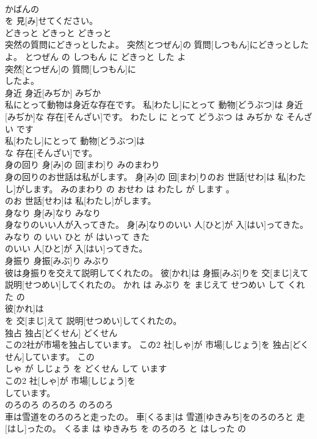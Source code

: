 \documentclass[8pt]{extreport}
\begin{document}
\begin{CJK}{UTF8}{min}
\\	かばんの
\\	を 見[み]せてください。			
\\	どきっと	どきっと	どきっと	
\\	突然の質問にどきっとしたよ。	突然[とつぜん]の 質問[しつもん]にどきっとしたよ。	とつぜん の しつもん に どきっと した よ	
\\	突然[とつぜん]の 質問[しつもん]に
\\	したよ。			
\\	身近	身近[みぢか]	みぢか	
\\	私にとって動物は身近な存在です。	私[わたし]にとって 動物[どうぶつ]は 身近[みぢか]な 存在[そんざい]です。	わたし に とって どうぶつ は みぢか な そんざい です	
\\	私[わたし]にとって 動物[どうぶつ]は
\\	な 存在[そんざい]です。			
\\	身の回り	身[み]の 回[まわ]り	みのまわり	
\\	身の回りのお世話は私がします。	身[み]の 回[まわ]りのお 世話[せわ]は 私[わたし]がします。	みのまわり の おせわ は わたし が します 。	
\\	のお 世話[せわ]は 私[わたし]がします。			
\\	身なり	身[み]なり	みなり	
\\	身なりのいい人が入ってきた。	身[み]なりのいい 人[ひと]が 入[はい]ってきた。	みなり の いい ひと が はいって きた	
\\	のいい 人[ひと]が 入[はい]ってきた。			
\\	身振り	身振[みぶ]り	みぶり	
\\	彼は身振りを交えて説明してくれたの。	彼[かれ]は 身振[みぶ]りを 交[まじ]えて 説明[せつめい]してくれたの。	かれ は みぶり を まじえて せつめい して くれた の	
\\	彼[かれ]は
\\	を 交[まじ]えて 説明[せつめい]してくれたの。			
\\	独占	独占[どくせん]	どくせん	
\\	この2社が市場を独占しています。	この2 社[しゃ]が 市場[しじょう]を 独占[どくせん]しています。	この 
\\	しゃ が しじょう を どくせん して います	
\\	この2 社[しゃ]が 市場[しじょう]を
\\	しています。			
\\	のろのろ	のろのろ	のろのろ	
\\	車は雪道をのろのろと走ったの。	車[くるま]は 雪道[ゆきみち]をのろのろと 走[はし]ったの。	くるま は ゆきみち を のろのろ と はしった の	

\end{CJK}
\end{document}
